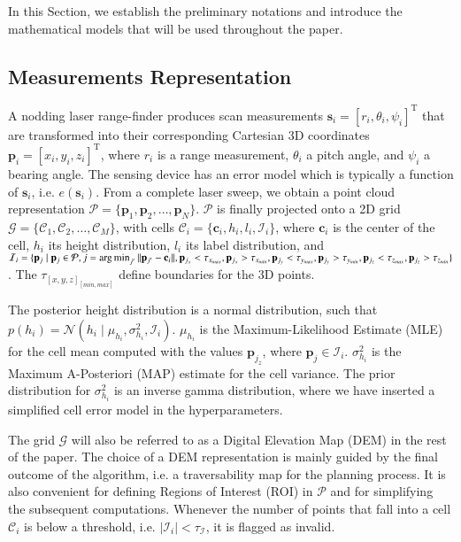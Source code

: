 In this Section, we establish the preliminary notations and introduce the
mathematical models that will be used throughout the paper.

\subsection{Measurements Representation}
A nodding laser range-finder produces scan measurements $\mathbf{s}_i=[r_i,
\theta_i,\psi_i]^\text{T}$ that are transformed into their corresponding
Cartesian 3D coordinates $\mathbf{p}_i=[x_i,y_i,z_i]^\text{T}$, where $r_i$ is
a range measurement, $\theta_i$ a pitch angle, and $\psi_i$ a bearing angle. The
sensing device has an error model which is typically a function of
$\mathbf{s}_i$, i.e. $e(\mathbf{s}_i)$. From a complete laser sweep, we obtain a
point cloud representation $\mathcal{P}=\{\mathbf{p}_1,\mathbf{p}_2,\dots,
\mathbf{p}_N\}$. $\mathcal{P}$ is finally projected onto a 2D grid $\mathcal{G}=
\{\mathcal{C}_1,\mathcal{C}_2,\dots,\mathcal{C}_M\}$, with cells $\mathcal{C}_i=
\{\mathbf{c}_i,h_i,l_i,\mathcal{I}_i\}$, where $\mathbf{c}_i$ is the center of
the cell, $h_i$ its height distribution, $l_i$ its label distribution, and
$\mathcal{I}_i=\{\mathbf{p}_j\mid\mathbf{p}_j\in\mathcal{P},j=\operatorname*{arg\,min}_{j'}||
\mathbf{p}_{j'}-\mathbf{c}_i||,\mathbf{p}_{j_x}<\tau_{x_{max}},\mathbf{p}_{j_x}>
\tau_{x_{min}},\mathbf{p}_{j_y}<\tau_{y_{max}},\mathbf{p}_{j_y}>\tau_{y_{min}},
\mathbf{p}_{j_z}<\tau_{z_{max}},\mathbf{p}_{j_z}>\tau_{z_{min}}\}$. The
$\tau_{[x,y,z]_{[min,max]}}$ define boundaries for the 3D points.

The posterior height distribution is a normal distribution, such that $p(h_i)=
\mathcal{N}(h_i\mid\mu_{h_i},\sigma^2_{h_i},\mathcal{I}_i)$. $\mu_{h_i}$ is the
Maximum-Likelihood Estimate (MLE) for the cell mean computed with the values
$\mathbf{p}_{j_z}$, where $\mathbf{p}_j\in\mathcal{I}_i$. $\sigma^2_{h_i}$ is
the Maximum A-Posteriori (MAP) estimate for the cell variance. The prior
distribution for $\sigma^2_{h_i}$ is an inverse gamma distribution, where we
have inserted a simplified cell error model in the hyperparameters.

The grid $\mathcal{G}$ will also be referred to as a Digital Elevation Map (DEM)
in the rest of the paper. The choice of a DEM representation is mainly guided by
the final outcome of the algorithm, i.e. a traversability map for the planning
process. It is also convenient for defining Regions of Interest (ROI) in
$\mathcal{P}$ and for simplifying the subsequent computations. Whenever the
number of points that fall into a cell $\mathcal{C}_i$ is below a threshold,
i.e. $|\mathcal{I}_i|<\tau_{\mathcal{I}}$, it is flagged as invalid.

